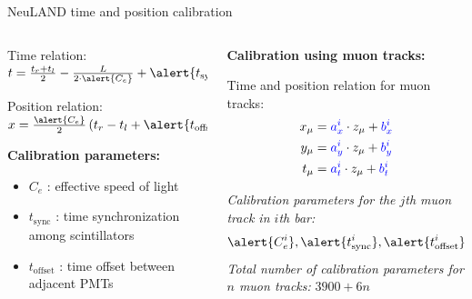 \documentclass{ikpKoeln}
\begin{document}
\begin{frame}[t]{NeuLAND time and position calibration}
	\vspace*{-2em}
	\begin{columns}[t]
		\begin{column}{0.45\textwidth}
			\begin{block}{\small Time relation:}
				\centering
				$ t = \frac{t_r + t_l}{2} - \frac{L}{2 \cdot \alert{C_e}} + \alert{t_\text{sync}}$
			\end{block}

			\begin{block}{\small Position relation:}
				\centering
				$ x = \frac{\alert{C_e}}{2}\left( t_r - t_l  + \alert{t_\text{offset}} \right)$
			\end{block}
			\flushleft\textbf{Calibration parameters:}
			\begin{itemize}
				\item \alert{$C_e$}  : effective speed of light
				\item \alert{$t_\text{sync}$} : time synchronization among scintillators
				\item \alert{$t_\text{offset}$} : time offset between adjacent PMTs
			\end{itemize}

		\end{column}
		\pause
		\begin{column}{0.45\textwidth}
			\flushleft\textbf{Calibration using muon tracks:}
			\begin{block}{\small Time and position relation for muon tracks:}
				\centering
				\vspace*{-1.5em}
				\begin{align}
					\small
					x_\mu & = \textcolor{blue}{a^i_x} \cdot z_\mu  + \textcolor{blue}{b^i_x} \\
					y_\mu & = \textcolor{blue}{a^i_y} \cdot z_\mu  + \textcolor{blue}{b^i_y} \\
					t_\mu & = \textcolor{blue}{a^i_t} \cdot z_\mu  + \textcolor{blue}{b^i_t}
				\end{align}
			\end{block}
			\flushleft\textit{\small Calibration parameters for the $j$th muon track in $i$th bar:}
			$$\alert{C^i_e}, \alert{t^i_\text{sync}}, \alert{t^i_\text{offset}},\textcolor{blue}{a^j_x}, \textcolor{blue}{a^j_y}, \textcolor{blue}{a^j_t}, \textcolor{blue}{b^j_x}, \textcolor{blue}{b^j_y}, \textcolor{blue}{b^j_t} $$
			\flushleft\textit{\small Total number of calibration parameters for $n$ muon tracks:} $ 3900 + 6n$
		\end{column}
	\end{columns}
\end{frame}
\end{document}
